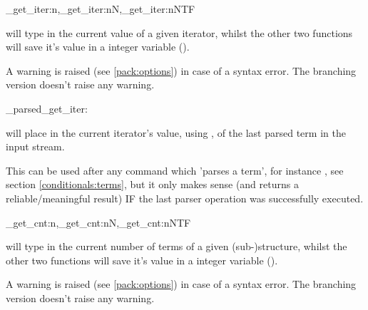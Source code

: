 \documentclass[10pt]{article}
\begin{document}
\begin{codedescribe}{\starray_get_iter:n,\starray_get_iter:nN,\starray_get_iter:nNTF}
\begin{codesyntax}%
\end{codesyntax}
\end{codedescribe}
 will type in the current value of a given iterator, whilst the other two functions will save it's value in a integer variable ().
\begin{tsremark}
A warning is raised (see \ref{pack:options}) in case of a  syntax error. The branching version doesn't raise any warning.
\end{tsremark}

\begin{codedescribe}[code,EXP,new=2023/05/20]{\starray_parsed_get_iter:}
\begin{codesyntax}%
\end{codesyntax}
 will place in the current iterator's value,  using , of the last parsed term in the input stream.
\end{codedescribe}
\begin{tsremark}
This can be used after any command which 'parses a term', for instance , see section \ref{conditionals:terms}, but it only makes sense (and returns a reliable/meaningful result) IF the last parser operation was successfully executed.
\end{tsremark}


\begin{codedescribe}{\starray_get_cnt:n,\starray_get_cnt:nN,\starray_get_cnt:nNTF}
\begin{codesyntax}%
\end{codesyntax}
\end{codedescribe}
 will type in the current number of terms of a given (sub-)structure, whilst the other two functions will save it's value in a integer variable ().
\begin{tsremark}
A warning is raised (see \ref{pack:options}) in case of a  syntax error. The branching version doesn't raise any warning.
\end{tsremark}
\end{document}
